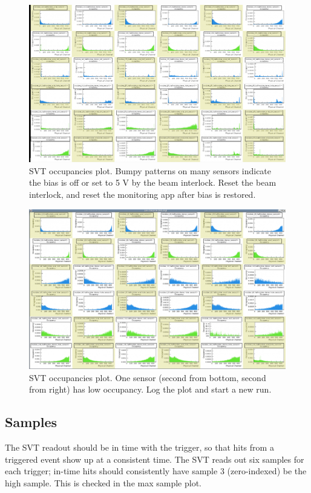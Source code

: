 \begin{figure}[ht!]
    \centering
    \includegraphics[width=\textwidth]{figures/occupancy_nobias}
    \caption{SVT occupancies plot. Bumpy patterns on many sensors indicate the bias is off or set to 5 V by the beam interlock. Reset the beam interlock, and reset the monitoring app after bias is restored.}
    \label{fig:occupancies_nobias}
\end{figure}

\begin{figure}[ht!]
    \centering
    \includegraphics[width=\textwidth]{figures/occupancy_badhybrid}
    \caption{SVT occupancies plot. One sensor (second from bottom, second from right) has low occupancy. Log the plot and start a new run.}
    \label{fig:occupancies_badhybrid}
\end{figure}

\subsection {Samples}
The SVT readout should be in time with the trigger, so that hits from a triggered event show up at a consistent time. The SVT reads out six samples for each trigger; in-time hits should consistently have sample 3 (zero-indexed) be the high sample. This is checked in the max sample plot.

